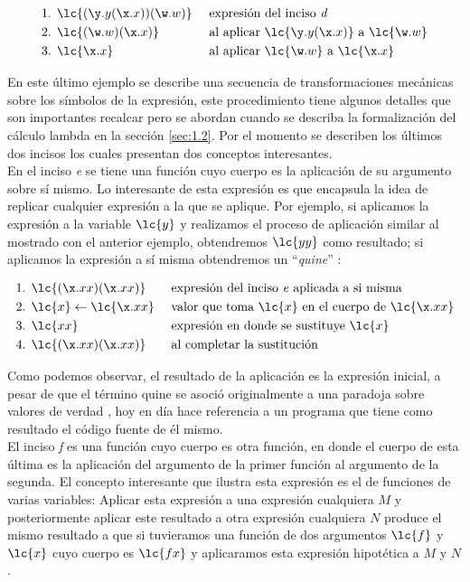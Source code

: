 \begin{align*}
  \text{1. } &\lc{(\y.y(\x.x))(\w.w)} & &\text{ expresión del inciso \emph{d}}\\
  \text{2. } &\lc{(\w.w)(\x.x)} & &\text{ al aplicar } \lc{\y.y(\x.x)} \text{ a } \lc{\w.w}\\
  \text{3. } &\lc{\x.x} & &\text{ al aplicar } \lc{\w.w} \text{ a } \lc{\x.x}
\end{align*}

En este último ejemplo se describe una secuencia de transformaciones mecánicas
sobre los símbolos de la expresión, este procedimiento tiene algunos detalles que
son importantes recalcar pero se abordan cuando se describa la formalización
del cálculo lambda en la sección \ref{sec:1.2}. Por el momento se describen los
últimos dos incisos los cuales presentan dos conceptos interesantes.\\ 

En el inciso \emph{e} se tiene una función cuyo cuerpo es la aplicación de su
argumento sobre sí mismo. Lo interesante de esta expresión es que encapsula la
idea de replicar cualquier expresión a la que se aplique. Por ejemplo, si
aplicamos la expresión a la variable \(\lc{y}\) y realizamos el proceso de
aplicación similar al mostrado con el anterior ejemplo, obtendremos \(\lc{y y}\)
como resultado; si aplicamos la expresión a sí misma obtendremos un
``\emph{quine}'' \cite{Hofstadter:GEB}:

\begin{align*}
  \text{1. } &\lc{(\x.x x)(\x.x x)} & &\text{ expresión del inciso \emph{e} aplicada a si misma}\\
  \text{2. } &\lc{x} \leftarrow \lc{\x.x x} & &\text{ valor que toma } \lc{x} \text{ en el cuerpo de } \lc{\x.x x}\\
  \text{3. } &\lc{x x} & &\text{ expresión en donde se sustituye } \lc{x}\\
  \text{4. } &\lc{(\x.x x)(\x.x x)} & &\text{ al completar la sustitución}
\end{align*}

Como podemos observar, el resultado de la aplicación es la expresión inicial, a
pesar de que el término quine se asoció originalmente a una paradoja sobre
valores de verdad \cite{Quine:Paradox}, hoy en día hace referencia a un programa
que tiene como resultado el código fuente de él mismo.\\

El inciso \emph{f} es una función cuyo cuerpo es otra función, en donde el cuerpo
de esta última es la aplicación del argumento de la primer función al argumento
de la segunda. El concepto interesante que ilustra esta expresión es el de
funciones de varias variables: Aplicar esta expresión a una expresión cualquiera
\(M\) y posteriormente aplicar este resultado a otra expresión cualquiera \(N\)
produce el mismo resultado a que si tuvieramos una función de dos argumentos
\(\lc{f}\) y \(\lc{x}\) cuyo cuerpo es \(\lc{f x}\) y aplicaramos esta expresión
hipotética a \(M\) y \(N\).\\

